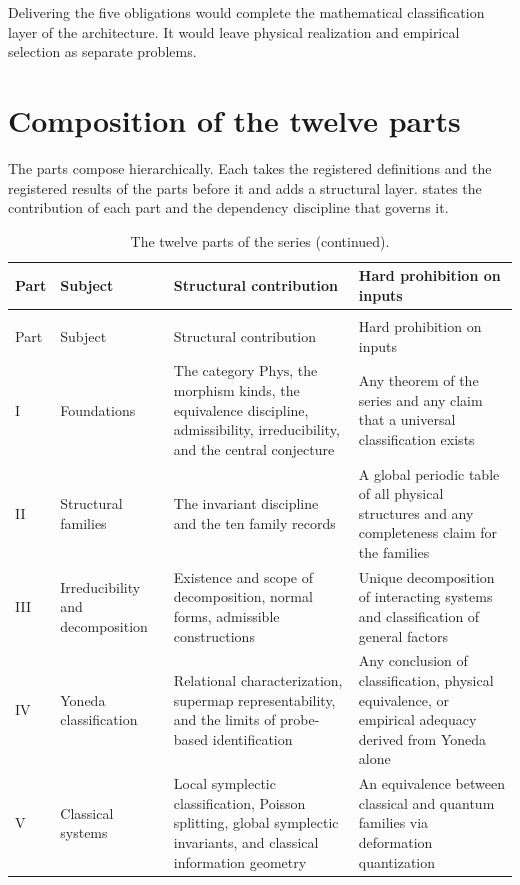 \documentclass[11pt,letterpaper]{article}
\theoremstyle{definition}
\theoremstyle{remark}
\begin{document}
Delivering the five obligations would complete the mathematical classification layer of the architecture. It would leave physical realization and empirical selection as separate problems.

\section{Composition of the twelve parts}

The parts compose hierarchically. Each takes the registered definitions and the registered results of the parts before it and adds a structural layer.  states the contribution of each part and the dependency discipline that governs it.

\begingroup
\small
\begin{xltabular}{\textwidth}{Y{0.35}Y{1.15}Y{1.55}Y{0.95}}
\caption{The twelve parts of the series, the structural contribution of each, and the hard prohibition that bounds its inputs.}\label{tab:parts}\\
\toprule
Part & Subject & Structural contribution & Hard prohibition on inputs \\
\midrule
\endfirsthead
\caption[]{The twelve parts of the series (continued).}\\
\toprule
Part & Subject & Structural contribution & Hard prohibition on inputs \\
\midrule
\endhead
\bottomrule
\endfoot
I & Foundations & The category $\mathrm{Phys}$, the morphism kinds, the equivalence discipline, admissibility, irreducibility, and the central conjecture & Any theorem of the series and any claim that a universal classification exists \\
II & Structural families & The invariant discipline and the ten family records & A global periodic table of all physical structures and any completeness claim for the families \\
III & Irreducibility and decomposition & Existence and scope of decomposition, normal forms, admissible constructions & Unique decomposition of interacting systems and classification of general factors \\
IV & Yoneda classification & Relational characterization, supermap representability, and the limits of probe-based identification & Any conclusion of classification, physical equivalence, or empirical adequacy derived from Yoneda alone \\
V & Classical systems & Local symplectic classification, Poisson splitting, global symplectic invariants, and classical information geometry & An equivalence between classical and quantum families via deformation quantization \\

\end{xltabular}
\end{document}
